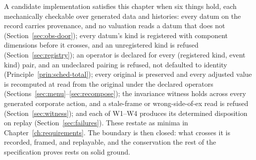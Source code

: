 A candidate implementation satisfies this chapter when six things hold, each mechanically
checkable over generated data and histories: every datum on the record carries provenance,
and no valuation reads a datum that does not (Section~\ref{sec:obs-door}); every datum's
kind is registered with component dimensions before it crosses, and an unregistered kind is
refused (Section~\ref{sec:registry}); an operator is declared for every (registered kind,
event kind) pair, and an undeclared pairing is refused, not defaulted to identity
(Principle~\ref{prin:sched-total}); every original is preserved and every adjusted value is
recomputed at read from the original under the declared operators
(Sections~\ref{sec:menu}--\ref{sec:recompose}); the invariance witness holds across every
generated corporate action, and a stale-frame or wrong-side-of-ex read is refused
(Section~\ref{sec:witness}); and each of W1--W4 produces its determined disposition on
replay (Section~\ref{sec:failures}). These restate as minima in
Chapter~\ref{ch:requirements}. The boundary is then closed: what crosses it is recorded,
framed, and replayable, and the conservation the rest of the specification proves rests on
solid ground.
